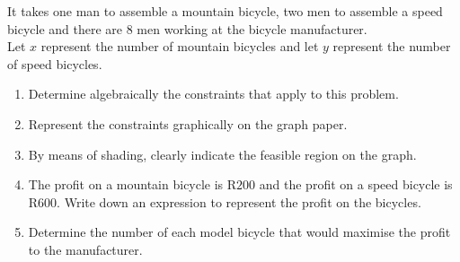 \begin{enumerate}
{It takes one man to assemble a mountain bicycle, two men to assemble a speed bicycle and there are $8$ men working at the bicycle manufacturer.\\
Let $x$ represent the number of mountain bicycles and let $y$ represent the number of speed bicycles.
\begin{enumerate}
\item{Determine algebraically the constraints that apply to this problem.}
\item{Represent the constraints graphically on the graph paper.}
\item{By means of shading, clearly indicate the feasible region on the graph.}
\item{The profit on a mountain bicycle is R$200$ and the profit on a speed bicycle is R$600$. Write down an expression to represent the profit on the bicycles.}
\item{Determine the number of each model bicycle that would maximise the profit to the manufacturer.}
\end{enumerate}}
\end{enumerate}







